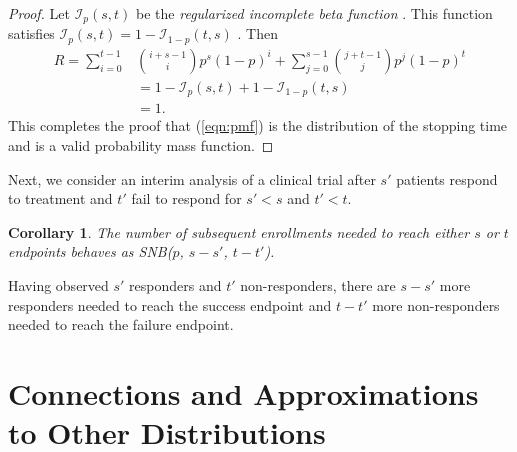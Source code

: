 \documentclass[review]{elsarticle}
\newtheorem{corollary}{Corollary}
\begin{document}
\begin{proof}
Let $\mathcal{I}_p(s, t)$ be the {\em regularized incomplete beta function} 
\citep{Olver2010}. This function satisfies 
$\mathcal{I}_p(s, t) = 1-\mathcal{I}_{1-p}(t, s)$ \citep{Uppuluri1967}. Then
\begin{align*}
R = \sum_{i=0}^{t-1} &{i+s-1 \choose i} p^s (1-p)^i +
\sum_{j=0}^{s-1}  {j+t-1 \choose j} p^j  (1-p)^t \\
   &= 1-\mathcal{I}_p(s, t) + 1 - \mathcal{I}_{1-p}(t, s) \\
   &= 1. 
\end{align*}
This completes the proof that (\ref{eqn:pmf}) is the distribution of the
stopping time and is a valid probability mass function.
\end{proof}

Next, we consider an interim analysis of a clinical trial after $s'$ 
patients respond to treatment 
and $t'$ fail to respond for $s' < s$ and $t' < t$.
\begin{corollary} \label{conditional_distribution}
The number of subsequent enrollments needed 
to reach either $s$ or $t$ endpoints behaves as SNB($p$, $s-s'$, $t-t'$).
\end{corollary}
Having observed $s'$ responders and $t'$ non-responders, there are $s-s'$ 
more responders needed to reach the success endpoint and $t-t'$ more 
non-responders needed to reach the failure endpoint.

\section{Connections and Approximations to Other Distributions}
\end{document}
